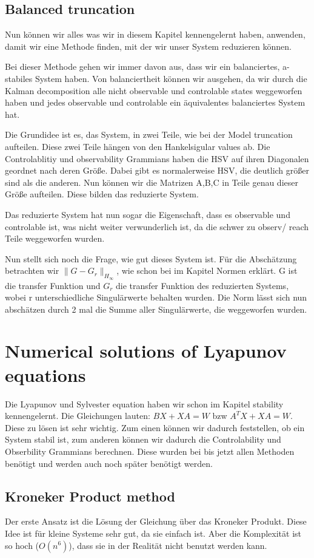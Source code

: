 \documentclass[]{article}
\begin{document}
\subsection{Balanced truncation} 
Nun können wir alles was wir in diesem Kapitel kennengelernt haben, anwenden, damit wir eine Methode finden, mit der wir unser System reduzieren können. 

Bei dieser Methode gehen wir immer davon aus, dass wir ein balanciertes, a-stabiles System haben. Von balanciertheit können wir ausgehen, da wir durch die Kalman decomposition alle nicht observable und controlable states weggeworfen haben und jedes observable und controlable ein äquivalentes balanciertes System hat. 

Die Grundidee ist es, das System, in zwei Teile, wie bei der Model truncation aufteilen. Diese zwei Teile hängen von den Hankelsigular values ab. Die Controlablitiy und observability Grammians haben die HSV auf ihren Diagonalen geordnet nach deren Größe. Dabei gibt es normalerweise HSV, die deutlich größer sind als die anderen. Nun können wir die Matrizen A,B,C in Teile genau dieser Größe aufteilen. Diese bilden das reduzierte System. 

Das reduzierte System hat nun sogar die Eigenschaft, dass es observable und controlable ist, was nicht weiter verwunderlich ist, da die schwer zu observ/ reach Teile weggeworfen wurden. 

Nun stellt sich noch die Frage, wie gut dieses System ist. Für die Abschätzung betrachten wir $\|G-G_r\|_{H_{\infty}}$, wie schon bei im Kapitel Normen erklärt. G ist die transfer Funktion und $G_r$ die transfer Funktion des reduzierten Systems, wobei r unterschiedliche Singulärwerte behalten wurden. Die Norm lässt sich nun abschätzen durch 2 mal die Summe aller Singulärwerte, die weggeworfen wurden.        
 
\section{Numerical solutions of Lyapunov equations}
Die Lyapunov und Sylvester equation haben wir schon im Kapitel stability kennengelernt. Die Gleichungen lauten: $BX+XA=W$ bzw $A^TX+XA=W$. Diese zu lösen ist sehr wichtig. Zum einen können wir dadurch feststellen, ob ein System stabil ist, zum anderen können wir dadurch die Controlability und Obserbility Grammians berechnen. Diese wurden bei bis jetzt allen Methoden benötigt und werden auch noch später benötigt werden.   

\subsection{Kroneker Product method}
Der erste Ansatz ist die Lösung der Gleichung über das Kroneker Produkt. Diese Idee ist für kleine Systeme sehr gut, da sie einfach ist. Aber die Komplexität ist so hoch ($O(n^6)$), dass sie in der Realität nicht benutzt werden kann. 
\end{document}
